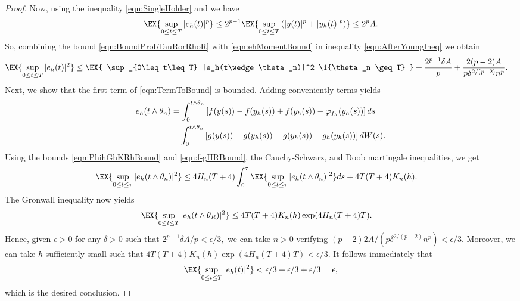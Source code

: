 \begin{proof}
	Now, using the inequality \eqref{eqn:SingleHolder} and  we have
	\begin{equation} \label{eqn:ehMomentBound}
		\EX{
			\sup_{0\leq t \leq T}
			|e_h(t)|^p
		}
		\leq
		2^{p-1}
		\EX{
			\sup_{0 \leq t \leq T}
			\left(
			|y(t)|^p + |y_h(t)|^p
			\right)
		}
		\leq 2^pA.
	\end{equation}
%
	So, combining the bound \eqref{eqn:BoundProbTauRorRhoR} with \eqref{eqn:ehMomentBound}
	in inequality \eqref{eqn:AfterYoungIneq} we obtain
	\begin{align}
		\EX{
			\sup_{0\leq t \leq T}
			|e_h(t)|^2
		}
		&\leq
			\EX{
				\sup_{0\leq t\leq T}
				|e_h(t\wedge \theta_n)|^2
				\1{\theta_n \geq T}
			}
			+\frac{2^{p+1}\delta A}{p}
			+\frac{2(p-2)A}{p\delta^{2/(p-2)}n^p}. \label{eqn:TermToBound}
	\end{align}
	Next, we show that the first term of \eqref{eqn:TermToBound} is bounded. Adding conveniently terms yields
	\begin{align*}
		e_h(t\wedge\theta_n) 
			&=
			\int_{0}^{t\wedge\theta_n}
			\left[
				f(y(s)) - f(y_h(s))+f(y_h(s))
				-\varphi_{f_h}(y_h(s))
			\right]ds \notag \\
			&+
			\int_{0}^{t\wedge\theta_n}
			\left[
				g(y(s)) - g(y_h(s))+g(y_h(s))
				-g_h(y_h(s))
			\right]dW(s).
	\end{align*}
	Using the bounds \eqref{eqn:PhihGhKRhBound} and \eqref{eqn:f-gHRBound}, the Cauchy-Schwarz, and
	Doob martingale inequalities, we get
	\begin{align*}
		\EX{\sup_{0\leq t \leq \tau}|e_h(t\wedge\theta_n)|^2}
		&\leq 
		4H_n(T+4)
		\int_{0}^{\tau}
			\EX{\sup_{0\leq t \leq \tau}|e_h(t\wedge\theta_n)|^2} ds 
		+
		4T(T+4)K_n(h).\notag
	\end{align*}
	The Gronwall inequality now yields
	\begin{align*}
		\EX{\sup_{0\leq t \leq T}|e_h(t\wedge\theta_R)|^2}
		&\leq
			4T(T+4)K_n(h)\exp(4H_n(T+4)T). %
	\end{align*}
	Hence, given $\epsilon>0$ for any $\delta>0$ such that
	$
		2^{p+1}\delta A/p< \epsilon/3,
	$
		we can take $n>0$ verifying
	$
		(p-2)2A/(p\delta^{2/(p-2)}n^p)<\epsilon/3.
	$
	Moreover, we can take $h$ sufficiently small such that
	$
		4T(T+4)K_n(h)\exp(4H_n(T+4)T) < \epsilon/3. 
	$
	It follows immediately that
	$$
		\EX{\sup_{0\leq t \leq T}|e_h(t)|^2}
		<
			\epsilon/3
			+\epsilon/3
			+\epsilon/3
		=\epsilon,
	$$ which is the desired conclusion.
\end{proof}

